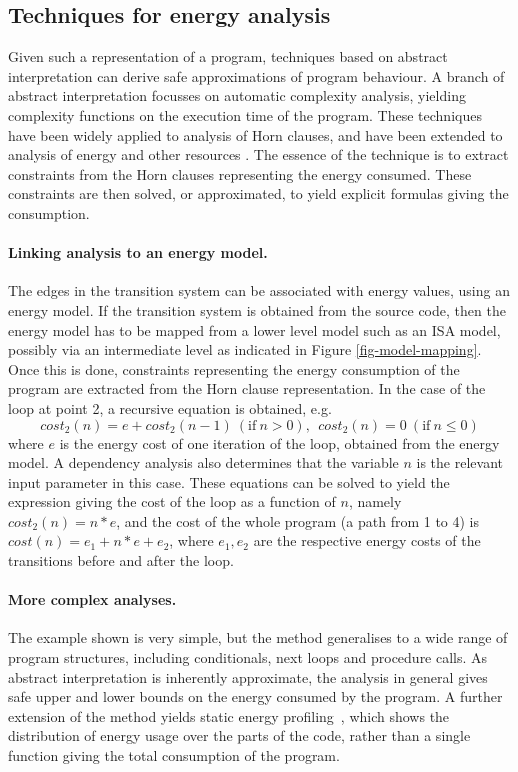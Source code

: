 \subsection{Techniques for energy analysis}

Given such a representation of a program, techniques based on abstract interpretation \cite{Cousot1977}
can derive safe approximations of program behaviour. A branch of abstract interpretation 
focusses on automatic complexity analysis, yielding complexity functions on the
execution time of the program.  These techniques have been widely applied to
analysis of Horn clauses, and have been extended to analysis of energy and
other resources \cite{resource-iclp07,jvm-cost-esop}. The essence of the technique is to extract constraints from the Horn clauses
representing the energy consumed. These constraints are then solved, or approximated, to yield explicit 
formulas giving the consumption.


 
\paragraph{Linking analysis to an energy model.} The edges in the transition system can be 
associated with energy values, using an energy model. If the transition system is obtained
from the source code, then the energy model has to be mapped from a lower level model
such as an ISA model, possibly via an intermediate level as indicated in Figure \ref{fig-model-mapping}. 
Once this is done, constraints
representing the energy consumption of the program are extracted from the Horn clause 
representation. In the case of the loop at point 2, a recursive equation is obtained, e.g.
\[ cost_2(n) = e + cost_2(n-1)~ (\mathrm{if}~n > 0), ~~cost_2(n) = 0 ~ (\mathrm{if}~n \le 0) \]
where $e$ is the energy cost of one iteration of the loop, obtained from the energy model. A dependency analysis
also determines that the variable $n$ is the relevant input parameter in this case. These
equations can be solved to yield the expression giving the cost of the loop as a function of $n$, 
namely $cost_2(n) = n*e$, and the cost of the whole 
program (a path from 1 to 4) is $cost(n) = e_1 + n*e + e_2$, where $e_1, e_2$ are the respective
energy costs of the transitions before and after the loop.

\paragraph{More complex analyses.} The example shown is very simple, but the method generalises to
a wide range of program structures, including conditionals, next loops and procedure calls.  
As abstract interpretation is inherently approximate, the analysis in general gives safe upper and lower bounds on the energy
consumed by the program. 
A further extension of the method yields
static energy profiling~\cite{staticprofiling-flops}, which shows the
distribution of energy usage over the parts of the code, rather than a single function giving the total consumption of the program.
